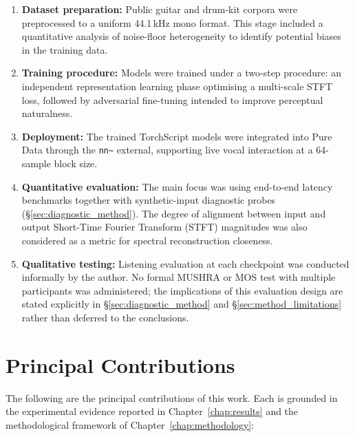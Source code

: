 \documentclass[a4paper,11pt,oneside,openany]{book}
\begin{document}
\begin{enumerate}
\item \textbf{Dataset preparation:} Public guitar and drum-kit corpora were preprocessed to a uniform 44.1\,kHz mono format. This stage included a quantitative analysis of noise-floor heterogeneity to identify potential biases in the training data.
\item \textbf{Training procedure:} Models were trained under a two-step procedure: an independent representation learning phase optimising a multi-scale STFT loss, followed by adversarial fine-tuning intended to improve perceptual naturalness.
\item \textbf{Deployment:} The trained TorchScript models were integrated into Pure Data through the \texttt{nn\textasciitilde} external, supporting live vocal interaction at a 64-sample block size.
\item \textbf{Quantitative evaluation:} The main focus was using end-to-end latency benchmarks together with synthetic-input diagnostic probes (\S\ref{sec:diagnostic_method}). The degree of alignment between input and output Short-Time Fourier Transform (STFT) magnitudes was also considered as a metric for spectral reconstruction closeness.
\item \textbf{Qualitative testing:} Listening evaluation at each checkpoint was conducted informally by the author. No formal MUSHRA or MOS test with multiple participants was administered; the implications of this evaluation design are stated explicitly in \S\ref{sec:diagnostic_method} and \S\ref{sec:method_limitations} rather than deferred to the conclusions.
\end{enumerate}

\section{Principal Contributions}\label{sec:contributions}

The following are the principal contributions of this work. Each is grounded in the experimental evidence reported in Chapter~\ref{chap:results} and the methodological framework of Chapter~\ref{chap:methodology}:
\end{document}
